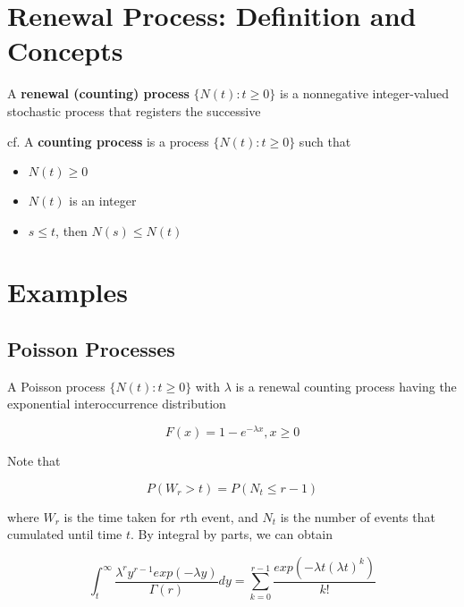 \documentclass[12pt]{article}
\theoremstyle{nonumberbreak}
\begin{document}
\section{Renewal Process: Definition and Concepts}

A \textbf{renewal (counting) process} $\{ N(t) : t \ge 0 \}$ is a nonnegative integer-valued stochastic process that registers the successive 

cf. A \textbf{counting process} is a process $\{ N(t) : t \ge 0 \}$ such that

\begin{itemize}
	\item $N(t) \ge 0$
	\item $N(t)$ is an integer
	\item $s \le t$, then $N(s) \le N(t)$
\end{itemize}

\section{Examples}

\subsection{Poisson Processes}

A Poisson process $\{N(t): t \ge 0 \}$ with $\lambda$ is a renewal counting process having the exponential interoccurrence distribution

$$
F(x) = 1 - e^{-\lambda x}, x \ge 0
$$

Note that 

$$
P(W_r > t) = P(N_t \le r-1)
$$

where $W_r$ is the time taken for $r$th event, and $N_t$ is the number of events that cumulated until time $t$. By integral by parts, we can obtain

$$
\int_t^\infty \frac{\lambda^r y^{r-1} exp(-\lambda y)}{\Gamma(r)} dy = \sum_{k=0}^{r-1} \frac{exp(-\lambda t (\lambda t)^k)}{k!}
$$
\end{document}
